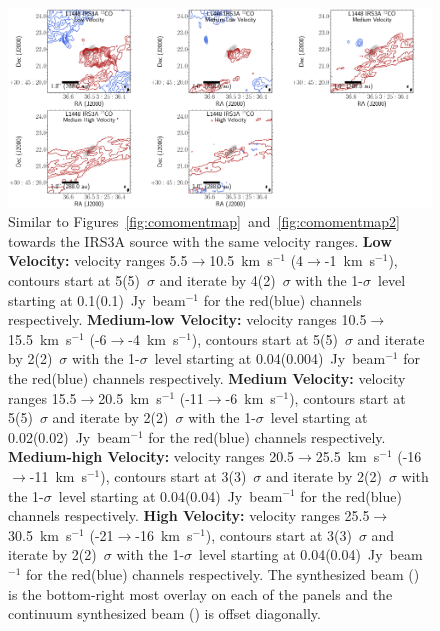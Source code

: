 \begin{figure}[H]
   \begin{center}
   \includegraphics[width=\textwidth]{img/L1448IRS3B_12CO_image_binned_clean-montage-irs3a.pdf}
   \caption{Similar to Figures~\ref{fig:comomentmap}~and~\ref{fig:comomentmap2} towards the IRS3A source with the same velocity ranges. \textbf{Low Velocity:} velocity ranges 5.5$\rightarrow$10.5~km~s$^{-1}$ (4$\rightarrow$-1~km~s$^{-1}$), contours start at 5(5)~$\sigma$ and iterate by 4(2)~$\sigma$ with the 1-$\sigma$~level starting at 0.1(0.1)~Jy~beam$^{-1}$ for the red(blue) channels respectively. \textbf{Medium-low Velocity:} velocity ranges 10.5$\rightarrow$15.5~km~s$^{-1}$ (-6$\rightarrow$-4~km~s$^{-1}$), contours start at 5(5)~$\sigma$ and iterate by 2(2)~$\sigma$ with the 1-$\sigma$~level starting at 0.04(0.004)~Jy~beam$^{-1}$ for the red(blue) channels respectively. \textbf{Medium Velocity:} velocity ranges 15.5$\rightarrow$20.5~km~s$^{-1}$ (-11$\rightarrow$-6~km~s$^{-1}$), contours start at 5(5)~$\sigma$ and iterate by 2(2)~$\sigma$ with the 1-$\sigma$~level starting at 0.02(0.02)~Jy~beam$^{-1}$ for the red(blue) channels respectively. \textbf{Medium-high Velocity:} velocity ranges 20.5$\rightarrow$25.5~km~s$^{-1}$ (-16$\rightarrow$-11~km~s$^{-1}$), contours start at 3(3)~$\sigma$ and iterate by 2(2)~$\sigma$ with the 1-$\sigma$~level starting at 0.04(0.04)~Jy~beam$^{-1}$ for the red(blue) channels respectively. \textbf{High Velocity:} velocity ranges 25.5$\rightarrow$30.5~km~s$^{-1}$ (-21$\rightarrow$-16~km~s$^{-1}$), contours start at 3(3)~$\sigma$ and iterate by 2(2)~$\sigma$ with the 1-$\sigma$~level starting at 0.04(0.04)~Jy~beam$^{-1}$ for the red(blue) channels respectively. The \co\space synthesized beam (\cobeam) is the bottom-right most overlay on each of the panels and the continuum synthesized beam (\contbeam) is offset diagonally.}\label{fig:comomentmapirs3a}
\end{center}
\end{figure}

